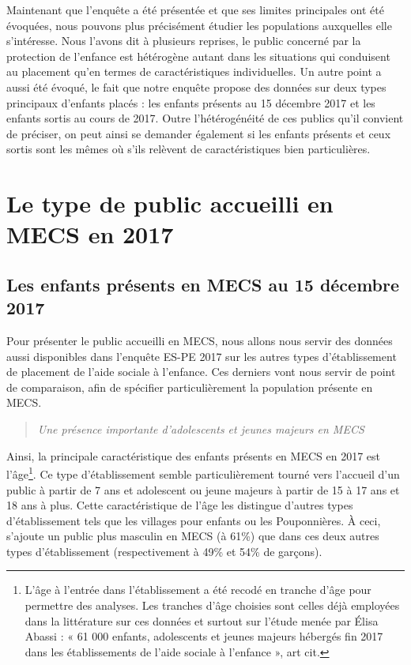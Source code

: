 \documentclass[
  12,
  a4paper,
]{report}
\begin{document}
Maintenant que l'enquête a été présentée et que ses limites principales
ont été évoquées, nous pouvons plus précisément étudier les populations
auxquelles elle s'intéresse. Nous l'avons dit à plusieurs reprises, le
public concerné par la protection de l'enfance est hétérogène autant
dans les situations qui conduisent au placement qu'en termes de
caractéristiques individuelles. Un autre point a aussi été évoqué, le
fait que notre enquête propose des données sur deux types principaux
d'enfants placés : les enfants présents au 15 décembre 2017 et les
enfants sortis au cours de 2017. Outre l'hétérogénéité de ces publics
qu'il convient de préciser, on peut ainsi se demander également si les
enfants présents et ceux sortis sont les mêmes où s'ils relèvent de
caractéristiques bien particulières.

\hypertarget{le-type-de-public-accueilli-en-mecs-en-2017}{%
\section{Le type de public accueilli en MECS en
2017}\label{le-type-de-public-accueilli-en-mecs-en-2017}}

\hypertarget{les-enfants-pruxe9sents-en-mecs-au-15-duxe9cembre-2017}{%
\subsection{Les enfants présents en MECS au 15 décembre
2017}\label{les-enfants-pruxe9sents-en-mecs-au-15-duxe9cembre-2017}}

Pour présenter le public accueilli en MECS, nous allons nous servir des
données aussi disponibles dans l'enquête ES-PE 2017 sur les autres types
d'établissement de placement de l'aide sociale à l'enfance. Ces derniers
vont nous servir de point de comparaison, afin de spécifier
particulièrement la population présente en MECS.

\begin{quote}
\emph{Une présence importante d'adolescents et jeunes majeurs en MECS}
\end{quote}

Ainsi, la principale caractéristique des enfants présents en MECS en
2017 est l'âge\footnote{L'âge à l'entrée dans l'établissement a été
  recodé en tranche d'âge pour permettre des analyses. Les tranches
  d'âge choisies sont celles déjà employées dans la littérature sur ces
  données et surtout sur l'étude menée par Élisa Abassi : « 61 000
  enfants, adolescents et jeunes majeurs hébergés fin 2017 dans les
  établissements de l'aide sociale à l'enfance », art cit.}. Ce type
d'établissement semble particulièrement tourné vers l'accueil d'un
public à partir de 7 ans et adolescent ou jeune majeurs à partir de 15 à
17 ans et 18 ans à plus. Cette caractéristique de l'âge les distingue
d'autres types d'établissement tels que les villages pour enfants ou les
Pouponnières. À ceci, s'ajoute un public plus masculin en MECS (à 61\%)
que dans ces deux autres types d'établissement (respectivement à 49\% et
54\% de garçons).
\end{document}
